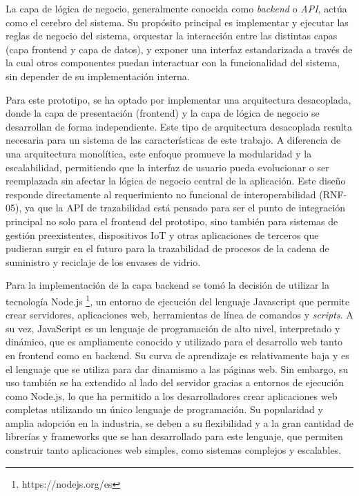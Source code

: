 La capa de lógica de negocio, generalmente conocida como \textit{backend} o \textit{API}, actúa como el cerebro del sistema. Su propósito principal es implementar y ejecutar las reglas de negocio del sistema, orquestar la interacción entre las distintas capas (capa frontend y capa de datos), y exponer una interfaz estandarizada a través de la cual otros componentes puedan interactuar con la funcionalidad del sistema, sin depender de su implementación interna.

Para este prototipo, se ha optado por implementar una arquitectura desacoplada, donde la capa de presentación (frontend) y la capa de lógica de negocio se desarrollan de forma independiente. Este tipo de arquitectura desacoplada resulta necesaria para un sistema de las características de este trabajo. A diferencia de una arquitectura monolítica, este enfoque promueve la modularidad y la escalabilidad, permitiendo que la interfaz de usuario pueda evolucionar o ser reemplazada sin afectar la lógica de negocio central de la aplicación. Este diseño responde directamente al requerimiento no funcional de interoperabilidad (RNF-05), ya que la API de trazabilidad está pensado para ser el punto de integración principal no solo para el frontend del prototipo, sino también para sistemas de gestión preexistentes, dispositivos IoT y otras aplicaciones de terceros que pudieran surgir en el futuro para la trazabilidad de procesos de la cadena de suministro y reciclaje de los envases de vidrio.

Para la implementación de la capa backend se tomó la decisión de utilizar la tecnología Node.js \footnote{https://nodejs.org/es}, un entorno de ejecución del lenguaje Javascript que permite crear servidores, aplicaciones web, herramientas de línea de comandos y \textit{scripts}. A su vez, JavaScript es un lenguaje de programación de alto nivel, interpretado y dinámico, que es ampliamente conocido y utilizado para el desarrollo web tanto en frontend como en backend. Su curva de aprendizaje es relativamente baja y es el lenguaje que se utiliza para dar dinamismo a las páginas web. Sin embargo, su uso también se ha extendido al lado del servidor gracias a entornos de ejecución como Node.js, lo que ha permitido a los desarrolladores crear aplicaciones web completas utilizando un único lenguaje de programación. Su popularidad y amplia adopción en la industria, se deben a su flexibilidad y a la gran cantidad de librerías y frameworks que se han desarrollado para este lenguaje, que permiten construir tanto aplicaciones web simples, como sistemas complejos y escalables.

